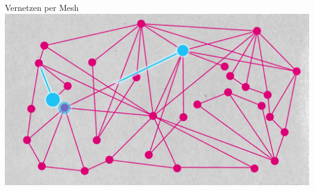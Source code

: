 \documentclass{beamer}
\begin{document}
	\begin{frame}{Vernetzen per Mesh}
		\includegraphics[width=\textwidth]{media/mesh2.png}
	\end{frame}


\end{document}

